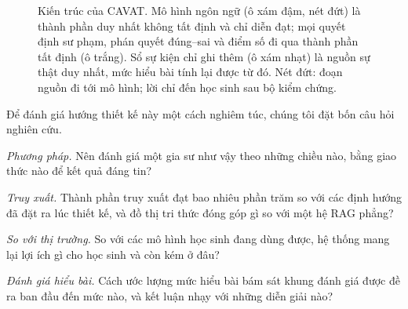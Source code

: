 \begin{figure}[tp]
\caption{Kiến trúc của CAVAT. Mô hình ngôn ngữ (ô xám đậm, nét đứt) là thành phần duy nhất không tất định và chỉ diễn đạt; mọi quyết định sư phạm, phán quyết đúng--sai và điểm số đi qua thành phần tất định (ô trắng). Sổ sự kiện chỉ ghi thêm (ô xám nhạt) là nguồn sự thật duy nhất, mức hiểu bài tính lại được từ đó. Nét đứt: đoạn nguồn đi tới mô hình; lời chỉ đến học sinh sau bộ kiểm chứng.}
\label{fig:arch}
\end{figure}

Để đánh giá hướng thiết kế này một cách nghiêm túc, chúng tôi đặt bốn câu hỏi nghiên cứu.
\begin{description}[leftmargin=3.2em,font=\normalfont]
  \item[\textbf{RQ1}] \emph{Phương pháp.} Nên đánh giá một gia sư như vậy theo những chiều nào, bằng giao thức nào để kết quả đáng tin?
  \item[\textbf{RQ2}] \emph{Truy xuất.} Thành phần truy xuất đạt bao nhiêu phần trăm so với các định hướng đã đặt ra lúc thiết kế, và đồ thị tri thức đóng góp gì so với một hệ RAG phẳng?
  \item[\textbf{RQ3}] \emph{So với thị trường.} So với các mô hình học sinh đang dùng được, hệ thống mang lại lợi ích gì cho học sinh và còn kém ở đâu?
  \item[\textbf{RQ4}] \emph{Đánh giá hiểu bài.} Cách ước lượng mức hiểu bài bám sát khung đánh giá được đề ra ban đầu đến mức nào, và kết luận nhạy với những diễn giải nào?
\end{description}

